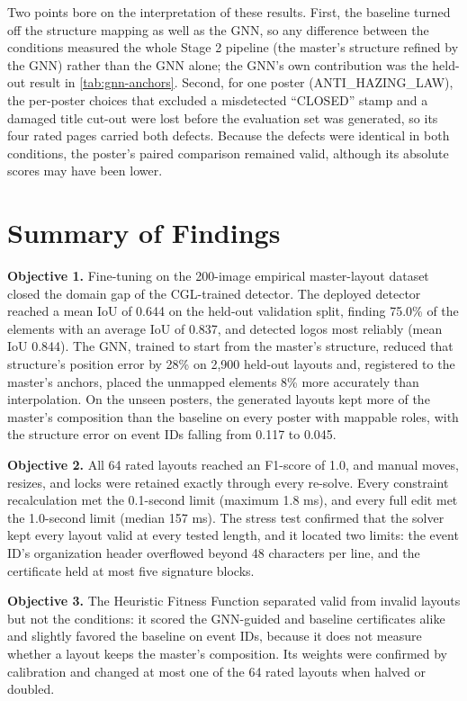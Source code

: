 \begin{refsection}
Two points bore on the interpretation of these results. First, the baseline turned off the structure mapping as well as the GNN, so any difference between the conditions measured the whole Stage 2 pipeline (the master's structure refined by the GNN) rather than the GNN alone; the GNN's own contribution was the held-out result in \ref{tab:gnn-anchors}. Second, for one poster (ANTI\_HAZING\_LAW), the per-poster choices that excluded a misdetected ``CLOSED'' stamp and a damaged title cut-out were lost before the evaluation set was generated, so its four rated pages carried both defects. Because the defects were identical in both conditions, the poster's paired comparison remained valid, although its absolute scores may have been lower. 

\section{Summary of Findings}

\textbf{Objective 1.} Fine-tuning on the 200-image empirical master-layout dataset closed the domain gap of the CGL-trained detector. The deployed detector reached a mean IoU of 0.644 on the held-out validation split, finding 75.0\% of the elements with an average IoU of 0.837, and detected logos most reliably (mean IoU 0.844). The GNN, trained to start from the master's structure, reduced that structure's position error by 28\% on 2,900 held-out layouts and, registered to the master's anchors, placed the unmapped elements 8\% more accurately than interpolation. On the unseen posters, the generated layouts kept more of the master's composition than the baseline on every poster with mappable roles, with the structure error on event IDs falling from 0.117 to 0.045.

\textbf{Objective 2.} All 64 rated layouts reached an F1-score of 1.0, and manual moves, resizes, and locks were retained exactly through every re-solve. Every constraint recalculation met the 0.1-second limit (maximum 1.8 ms), and every full edit met the 1.0-second limit (median 157 ms). The stress test confirmed that the solver kept every layout valid at every tested length, and it located two limits: the event ID's organization header overflowed beyond 48 characters per line, and the certificate held at most five signature blocks.

\textbf{Objective 3.} The Heuristic Fitness Function separated valid from invalid layouts but not the conditions: it scored the GNN-guided and baseline certificates alike and slightly favored the baseline on event IDs, because it does not measure whether a layout keeps the master's composition. Its weights were confirmed by calibration and changed at most one of the 64 rated layouts when halved or doubled. 


\end{refsection}

